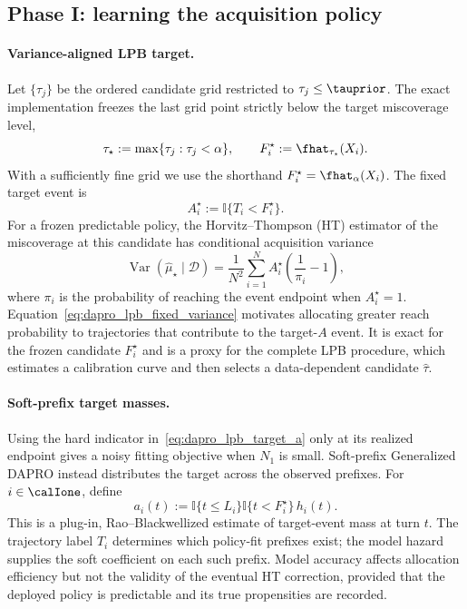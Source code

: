 \subsection{Phase I: learning the acquisition policy}

\paragraph{Variance-aligned LPB target.}
Let $\{\tau_j\}$ be the ordered candidate grid restricted to
$\tau_j\leq\tauprior$.  The exact implementation freezes the last grid point
strictly below the target miscoverage level,
\begin{equation}
    \tau_\star:=\max\{\tau_j:\tau_j<\alpha\},
    \qquad F_i^\star:=\fhat_{\tau_\star}(X_i).
    \label{eq:dapro_lpb_anchor}
\end{equation}
With a sufficiently fine grid we use the shorthand $F_i^\star=\fhat_\alpha(X_i)$.
The fixed target event is
\begin{equation}
    A_i^\star:=\mathbb I\{T_i<F_i^\star\}.
    \label{eq:dapro_lpb_target_a}
\end{equation}
For a frozen predictable policy, the Horvitz--Thompson (HT) estimator of the
miscoverage at this candidate has conditional acquisition variance
\begin{equation}
    \operatorname{Var}\!\left(\widehat\mu_\star\mid\mathcal D\right)
    =\frac{1}{N^2}\sum_{i=1}^{N}
      A_i^\star\left(\frac{1}{\pi_i}-1\right),
    \label{eq:dapro_lpb_fixed_variance}
\end{equation}
where $\pi_i$ is the probability of reaching the event endpoint when
$A_i^\star=1$.  Equation~\eqref{eq:dapro_lpb_fixed_variance} motivates
allocating greater reach probability to trajectories that contribute to the
target-$A$ event.  It is exact for the frozen candidate $F_i^\star$ and is a
proxy for the complete LPB procedure, which estimates a calibration curve and
then selects a data-dependent candidate $\widehat\tau$.

\paragraph{Soft-prefix target masses.}
Using the hard indicator in~\eqref{eq:dapro_lpb_target_a} only at its realized
endpoint gives a noisy fitting objective when $N_1$ is small.  Soft-prefix
Generalized DAPRO instead distributes the target across the observed prefixes.
For $i\in\calIone$, define
\begin{equation}
    a_i(t):=
    \mathbb I\{t\leq L_i\}
    \mathbb I\{t<F_i^\star\}\,h_i(t).
    \label{eq:dapro_lpb_soft_mass}
\end{equation}
This is a plug-in, Rao--Blackwellized estimate of target-event mass at turn
$t$.  The trajectory label $T_i$ determines which policy-fit prefixes exist;
the model hazard supplies the soft coefficient on each such prefix.  Model
accuracy affects allocation efficiency but not the validity of the eventual
HT correction, provided that the deployed policy is predictable and its true
propensities are recorded.

